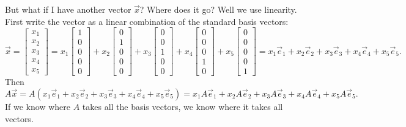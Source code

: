 But what if I have another vector $\vec{x}$?  Where does it go?  Well we use
linearity.  First write the vector as a linear combination of the standard
basis vectors:
\begin{equation*}
\vec{x} =
\begin{bmatrix}
x_1 \\ x_2 \\ x_3 \\ x_4 \\ x_5
\end{bmatrix}
=
x_1
\begin{bmatrix}
1 \\ 0 \\ 0 \\ 0 \\ 0
\end{bmatrix}
+
x_2
\begin{bmatrix}
0 \\ 1 \\ 0 \\ 0 \\ 0
\end{bmatrix}
+
x_3
\begin{bmatrix}
0 \\ 0 \\ 1 \\ 0 \\ 0
\end{bmatrix}
+
x_4
\begin{bmatrix}
0 \\ 0 \\ 0 \\ 1 \\ 0
\end{bmatrix}
+
x_5
\begin{bmatrix}
0 \\ 0 \\ 0 \\ 0 \\ 1
\end{bmatrix}
=
x_1 \vec{e}_1 + 
x_2 \vec{e}_2 + 
x_3 \vec{e}_3 + 
x_4 \vec{e}_4 + 
x_5 \vec{e}_5 .
\end{equation*}
Then
\begin{equation*}
A \vec{x}
=
A ( 
x_1 \vec{e}_1 + 
x_2 \vec{e}_2 + 
x_3 \vec{e}_3 + 
x_4 \vec{e}_4 + 
x_5 \vec{e}_5 
)
=
x_1 A\vec{e}_1 + 
x_2 A\vec{e}_2 + 
x_3 A\vec{e}_3 + 
x_4 A\vec{e}_4 + 
x_5 A\vec{e}_5 .
\end{equation*}
If we know where $A$ takes all the basis vectors, we know where it takes
all vectors.

